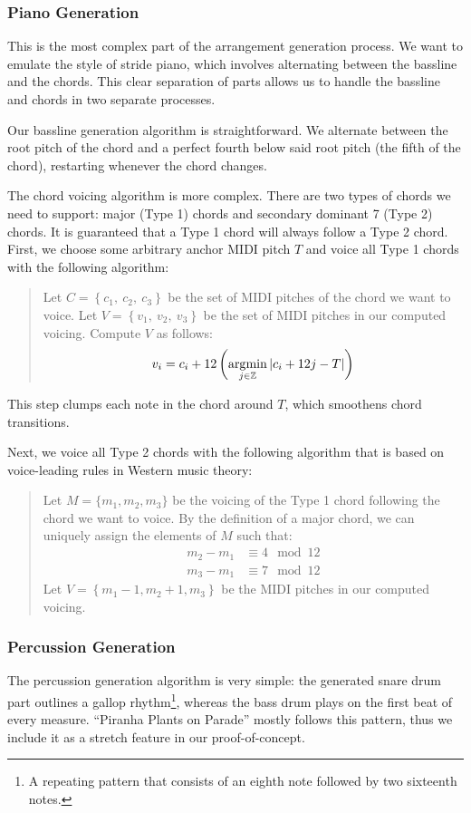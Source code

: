 \subsubsection{Piano Generation}

This is the most complex part of the arrangement generation process. We want to emulate the style of stride piano, which involves alternating between the bassline and the chords. This clear separation of parts allows us to handle the bassline and chords in two separate processes.

Our bassline generation algorithm is straightforward. We alternate between the root pitch of the chord and a perfect fourth below said root pitch (the fifth of the chord), restarting whenever the chord changes.

The chord voicing algorithm is more complex. There are two types of chords we need to support: major (Type 1) chords and secondary dominant 7 (Type 2) chords. It is guaranteed that a Type 1 chord will always follow a Type 2 chord. First, we choose some arbitrary anchor MIDI pitch $T$ and voice all Type 1 chords with the following algorithm:
\begin{quote}
    Let $C = \left\{ c_1, \ c_2, \ c_3 \right\}$ be the set of MIDI pitches of the chord we want to voice.
    Let $V = \left\{ v_1, \ v_2, \ v_3 \right\}$ be the set of MIDI pitches in our computed voicing.
    Compute $V$ as follows:
    $$v_i = c_i + 12 \left( \operatorname*{\arg\!\min}_{j \in \mathbb{Z}} \left\lvert c_i + 12j - T \right\rvert \right)$$
\end{quote}
This step clumps each note in the chord around $T$, which smoothens chord transitions.

Next, we voice all Type 2 chords with the following algorithm that is based on voice-leading rules in Western music theory:
\begin{quote}
    Let $M = \{ m_1, m_2, m_3\}$ be the voicing of the Type 1 chord following the chord we want to voice. By the definition of a major chord, we can uniquely assign the elements of $M$ such that:
    \begin{align*}
        m_2 - m_1 &\equiv 4 \mod 12 \\
        m_3 - m_1 &\equiv 7 \mod 12
    \end{align*}
    Let $V = \left\{ m_1 - 1, m_2 + 1, m_3 \right\}$ be the MIDI pitches in our computed voicing.
\end{quote}

\subsubsection{Percussion Generation}

The percussion generation algorithm is very simple: the generated snare drum part outlines a gallop rhythm\footnote{A repeating pattern that consists of an eighth note followed by two sixteenth notes.}, whereas the bass drum plays on the first beat of every measure. ``Piranha Plants on Parade'' mostly follows this pattern, thus we include it as a stretch feature in our proof-of-concept.
